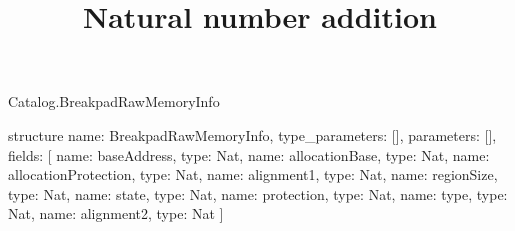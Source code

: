 \begin{lexlean}{Catalog.BreakpadRawMemoryInfo}
\title{Natural number addition}
\begin{semanticmodule}
structure{
  name: BreakpadRawMemoryInfo,
  type_parameters: [],
  parameters: [],
  fields: [
    {name: baseAddress, type: Nat},
    {name: allocationBase, type: Nat},
    {name: allocationProtection, type: Nat},
    {name: alignment1, type: Nat},
    {name: regionSize, type: Nat},
    {name: state, type: Nat},
    {name: protection, type: Nat},
    {name: type, type: Nat},
    {name: alignment2, type: Nat}
  ]
}
\end{semanticmodule}
\end{lexlean}
